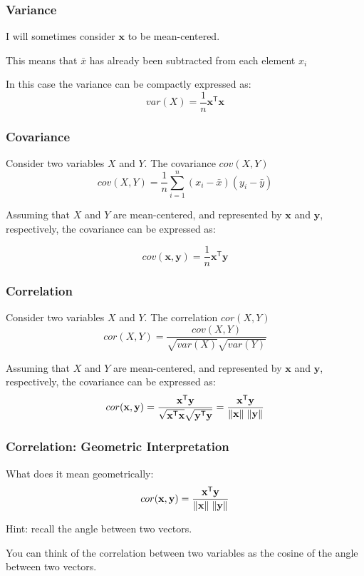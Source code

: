 \documentclass[12pt]{beamer}\usepackage[]{graphicx}\usepackage[]{color}
\begin{document}

\begin{frame}
\frametitle{Variance}

\bi
  \item I will sometimes consider $\mathbf{x}$ to be mean-centered.
  \item This means that $\bar{x}$ has already been subtracted from each element $x_i$
\ei

In this case the variance can be compactly expressed as:
$$
var(X) = \frac{1}{n} \mathbf{x^{\mathsf{T}} x}
$$

\end{frame}


\begin{frame}
\frametitle{Covariance}

Consider two variables $X$ and $Y$. The covariance $cov(X,Y)$
$$
cov(X,Y) = \frac{1}{n} \sum_{i=1}^{n} (x_i - \bar{x})(y_i - \bar{y})
$$

\pause
Assuming that $X$ and $Y$ are mean-centered, and represented by 
$\mathbf{x}$ and $\mathbf{y}$, respectively, the covariance can be expressed as:

{\large
$$
cov(\mathbf{x}, \mathbf{y}) = \frac{1}{n} \mathbf{x^{\mathsf{T}} y}
$$
}

\end{frame}


\begin{frame}
\frametitle{Correlation}

Consider two variables $X$ and $Y$. The correlation $cor(X,Y)$
$$
cor(X,Y) = \frac{cov(X,Y)}{\sqrt{var(X)} \sqrt{var(Y)}}
$$

\pause
Assuming that $X$ and $Y$ are mean-centered, and represented by 
$\mathbf{x}$ and $\mathbf{y}$, respectively, the covariance can be expressed as:
$$
cor(\mathbf{x}, \mathbf{y}) = \frac{\mathbf{x^{\mathsf{T}} y}}{\sqrt{\mathbf{x^\mathsf{T} x}} \sqrt{\mathbf{y^\mathsf{T} y}}} = \frac{\mathbf{x^{\mathsf{T}} y}}{\| \mathbf{x} \| \hspace{1mm} \| \mathbf{y} \|}
$$

\end{frame}


\begin{frame}
\frametitle{Correlation: Geometric Interpretation}

What does it mean geometrically:
$$
cor(\mathbf{x}, \mathbf{y}) = \frac{\mathbf{x^{\mathsf{T}} y}}{\| \mathbf{x} \| \hspace{1mm} \| \mathbf{y} \|}
$$

{\lit Hint: recall the angle between two vectors.}

\bigskip
You can think of the correlation between two variables as the cosine of the 
angle between two vectors.

\end{frame}

\end{document}
